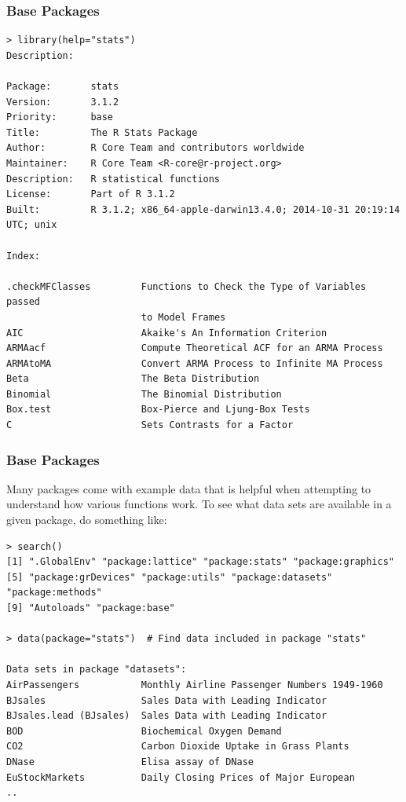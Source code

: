 \documentclass{beamer}
\begin{document}
\begin{frame}[fragile]
\frametitle{Base Packages}
\scriptsize
\begin{verbatim}
> library(help="stats")
Description:

Package:       stats
Version:       3.1.2
Priority:      base
Title:         The R Stats Package
Author:        R Core Team and contributors worldwide
Maintainer:    R Core Team <R-core@r-project.org>
Description:   R statistical functions
License:       Part of R 3.1.2
Built:         R 3.1.2; x86_64-apple-darwin13.4.0; 2014-10-31 20:19:14 UTC; unix

Index:

.checkMFClasses         Functions to Check the Type of Variables passed
                        to Model Frames
AIC                     Akaike's An Information Criterion
ARMAacf                 Compute Theoretical ACF for an ARMA Process
ARMAtoMA                Convert ARMA Process to Infinite MA Process
Beta                    The Beta Distribution
Binomial                The Binomial Distribution
Box.test                Box-Pierce and Ljung-Box Tests
C                       Sets Contrasts for a Factor
\end{verbatim}
\end{frame}



\begin{frame}[fragile]
\frametitle{Base Packages}
Many packages come with example data that is helpful when attempting to understand how various functions work. To see what data sets are available in a given package, do something like:
\scriptsize
\begin{verbatim}
> search()
[1] ".GlobalEnv" "package:lattice" "package:stats" "package:graphics" 
[5] "package:grDevices" "package:utils" "package:datasets" "package:methods" 
[9] "Autoloads" "package:base"

> data(package="stats")  # Find data included in package "stats"

Data sets in package "datasets":
AirPassengers           Monthly Airline Passenger Numbers 1949-1960
BJsales                 Sales Data with Leading Indicator
BJsales.lead (BJsales)  Sales Data with Leading Indicator
BOD                     Biochemical Oxygen Demand
CO2                     Carbon Dioxide Uptake in Grass Plants
DNase                   Elisa assay of DNase
EuStockMarkets          Daily Closing Prices of Major European
..
\end{verbatim}
\end{frame}
\end{document}
